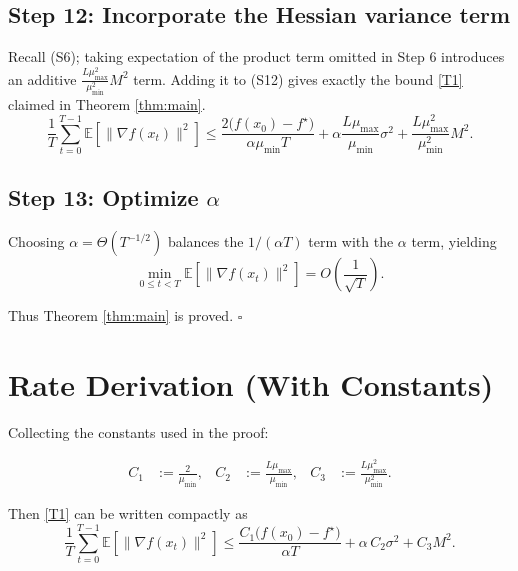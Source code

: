 \documentclass{article}
\newcommand{\E}{\mathbb{E}}
\begin{document}
\subsection*{Step 12: Incorporate the Hessian variance term}
Recall (S6); taking expectation of the product term omitted in Step 6 introduces an additive
$\frac{L\mu_{\max}^{2}}{\mu_{\min}^{2}}M^{2}$ term. Adding it to (S12) gives exactly the bound
\eqref{T1} claimed in Theorem \ref{thm:main}.
\[
\boxed{
\frac{1}{T}\sum_{t=0}^{T-1}\E[\|\nabla f(x_t)\|^{2}]
\le
\frac{2\big(f(x_0)-f^{\star}\big)}{\alpha\mu_{\min}T}
+\alpha\frac{L\mu_{\max}}{\mu_{\min}}\sigma^{2}
+\frac{L\mu_{\max}^{2}}{\mu_{\min}^{2}}M^{2}}.
\tag{S13}
\]

\subsection*{Step 13: Optimize $\alpha$}
Choosing $\alpha = \Theta(T^{-1/2})$ balances the $1/(\alpha T)$ term with the $\alpha$ term,
yielding
\[
\min_{0\le t<T}\E[\|\nabla f(x_t)\|^{2}]
=O\!\left(\frac{1}{\sqrt{T}}\right).
\tag{S14}
\]

Thus Theorem \ref{thm:main} is proved. $\square$

\section*{Rate Derivation (With Constants)}
Collecting the constants used in the proof:

\[
\begin{aligned}
C_{1}&:=\frac{2}{\mu_{\min}}, &
C_{2}&:=\frac{L\mu_{\max}}{\mu_{\min}}, &
C_{3}&:=\frac{L\mu_{\max}^{2}}{\mu_{\min}^{2}}.
\end{aligned}
\]

Then \eqref{T1} can be written compactly as
\[
\frac{1}{T}\sum_{t=0}^{T-1}\E[\|\nabla f(x_t)\|^{2}]
\le
\frac{C_{1}\big(f(x_0)-f^{\star}\big)}{\alpha T}
+\alpha\,C_{2}\sigma^{2}+C_{3}M^{2}.
\]
\end{document}
